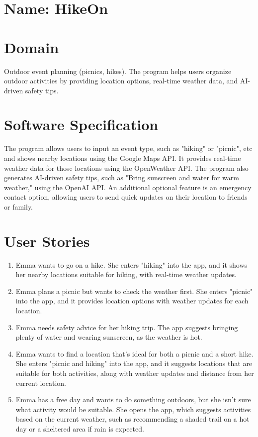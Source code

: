\documentclass{article}
\begin{document}
\section*{Name: HikeOn}

\section*{Domain}
Outdoor event planning (picnics, hikes). The program helps users organize outdoor activities by providing location options, real-time weather data, and AI-driven safety tips.

\section*{Software Specification}
The program allows users to input an event type, such as "hiking" or "picnic", etc and shows nearby locations using the Google Maps API. It provides real-time weather data for those locations using the OpenWeather API. The program also generates AI-driven safety tips, such as "Bring sunscreen and water for warm weather," using the OpenAI API. An additional optional feature is an emergency contact option, allowing users to send quick updates on their location to friends or family.

\section*{User Stories}
\begin{enumerate}
    \item Emma wants to go on a hike. She enters "hiking" into the app, and it shows her nearby locations suitable for hiking, with real-time weather updates. 
    \item Emma plans a picnic but wants to check the weather first. She enters "picnic" into the app, and it provides location options with weather updates for each location.
    \item Emma needs safety advice for her hiking trip. The app suggests bringing plenty of water and wearing sunscreen, as the weather is hot. 
    \item  Emma wants to find a location that's ideal for both a picnic and a short hike. She enters "picnic and hiking" into the app, and it suggests locations that are suitable for both activities, along with weather updates and distance from her current location.
    \item Emma has a free day and wants to do something outdoors, but she isn’t sure what activity would be suitable. She opens the app, which suggests activities based on the current weather, such as recommending a shaded trail on a hot day or a sheltered area if rain is expected.
\end{enumerate}
\end{document}
